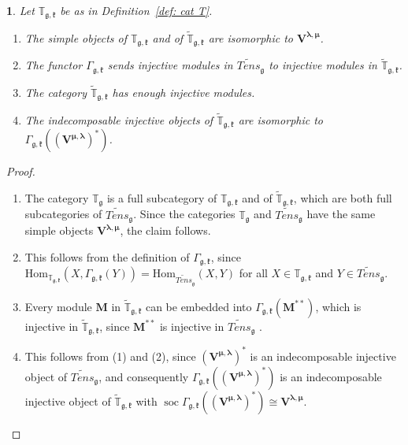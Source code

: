 \documentclass[12pt,oneside,english]{amsart}
\numberwithin{equation}{section}
\numberwithin{figure}{section}
\theoremstyle{plain}
\theoremstyle{plain}
\newtheorem{lem}[thm]{\protect\lemmaname}
\theoremstyle{remark}
\theoremstyle{definition}
\theoremstyle{plain}
\theoremstyle{remark}
\theoremstyle{definition}
\theoremstyle{plain}
\theoremstyle{plain}
\theoremstyle{definition}
\providecommand{\lemmaname}{Lemma}
\newcommand{\bV}{\mathbf{V}}
\newcommand{\bM}{\mathbf{M}}
\newcommand{\soc}{\operatorname{soc}}
\newcommand{\fg}{\mathfrak{g}}
\newcommand{\fk}{\mathfrak{k}}
\begin{document}
\begin{lem}\label{lem: R1} Let $\mathbb{T}_{\fg,\fk}$  be as in Definition~\ref{def: cat T}.
\begin{enumerate}
\item The simple objects of $\mathbb{T}_{\fg,\fk}$ and of $\widetilde{\mathbb{T}}_{\fg,\fk}$ are isomorphic to $\bV^{\boldsymbol{\lambda},{\boldsymbol{\mu}}}$.
\item The functor $\Gamma_{\fg,\fk}$  sends injective modules in $\widetilde{Tens}_{\mathfrak{g}}$ to injective modules in $ \widetilde{\mathbb{T}}_{\fg,\fk}$.
\item The category $\widetilde{\mathbb{T}}_{\fg,\fk}$ has  enough injective modules.
\item The indecomposable injective objects of $\widetilde{\mathbb{T}}_{\fg,\fk}$  are isomorphic to $\Gamma_{\fg,\fk}((\bV^{{\boldsymbol{\mu}},\boldsymbol{\lambda}} )^*)$.
\end{enumerate}
\end{lem}
\begin{proof}
\begin{enumerate}
\item The category  $\mathbb{T}_{\fg}$ is a full subcategory of  $\mathbb{T}_{\fg,\fk}$ and of  $\widetilde{\mathbb{T}}_{\fg,\fk}$, which are both full subcategories of  $\widetilde{Tens}_{\mathfrak{g}}$. Since the categories $\mathbb{T}_{\fg}$ and $\widetilde{Tens}_{\mathfrak{g}}$ have the same simple objects $\bV^{\boldsymbol{\lambda},{\boldsymbol{\mu}}}$, the claim follows.
\item This follows from the definition of $\Gamma_{\fg,\fk}$, since $\mathrm{Hom}_{\mathbb{T}_{\fg,\fk}}(X,\Gamma_{\fg,\fk}(Y))= \mathrm{Hom}_{\widetilde{Tens}_{\mathfrak{g}}}(X,Y)$ for all $X\in\mathbb{T}_{\fg,\fk}$ and $Y\in \widetilde{Tens}_{\mathfrak{g}}$.
\item Every module $\bM$ in  $\widetilde{\mathbb{T}}_{\fg,\fk}$ can be embedded into $\Gamma_{\fg,\fk}(\bM^{**})$, which is  injective in  $\widetilde{\mathbb{T}}_{\fg,\fk}$, since $\bM^{**}$ is injective in $\widetilde{Tens}_{\mathfrak{g}}$ \cite{PS}.
\item This follows from (1) and (2), since $(\bV^{{\boldsymbol{\mu}},\boldsymbol{\lambda}})^*$ is an indecomposable injective object of $\widetilde{Tens}_{\mathfrak{g}}$, and consequently $\Gamma_{\fg,\fk}((\bV^{{\boldsymbol{\mu}},\boldsymbol{\lambda}})^*)$ is an indecomposable injective object of $\widetilde{\mathbb{T}}_{\fg,\fk}$ with $\soc \Gamma_{\fg,\fk}((\bV^{{\boldsymbol{\mu}},\boldsymbol{\lambda}} )^*)\cong \bV^{{\boldsymbol{\lambda}},\boldsymbol{\mu}}$.
\end{enumerate}
\end{proof}
\end{document}
